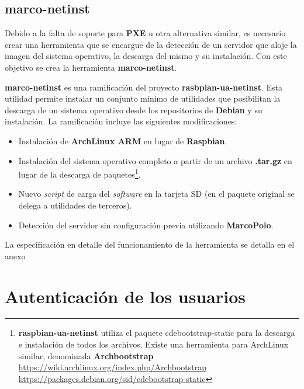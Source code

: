 \subsection{marco-netinst}

Debido a la falta de soporte para \textbf{PXE} u otra alternativa similar, es necesario crear una herramienta que se encargue de la detección de un servidor que aloje la imagen del sistema operativo, la descarga del mismo y su instalación. Con este objetivo se crea la herramienta \textbf{marco-netinst}.

\textbf{marco-netinst} es una ramificación del proyecto \textbf{rasbpian-ua-netinst}\cite{raspbian-ua-netinst}. Esta utilidad permite instalar un conjunto mínimo de utilidades que posibilitan la descarga de un sistema operativo desde los repositorios de \textbf{Debian} y su instalación. La ramificación incluye las siguientes modificaciones:

\begin{itemize}
	\item Instalación de \textbf{ArchLinux ARM} en lugar de \textbf{Raspbian}.
	\item Instalación del sistema operativo completo a partir de un archivo \textbf{.tar.gz} en lugar de la descarga de paquetes\footnote{\textbf{raspbian-ua-netinst} utiliza el paquete cdebootstrap-static para la descarga e instalación de todos los archivos. Existe una herramienta para ArchLinux similar, denominada \textbf{Archbootstrap}\\
	\href{https://wiki.archlinux.org/index.php/Archbootstrap}{https://wiki.archlinux.org/index.php/Archbootstrap}\\
	\href{https://packages.debian.org/sid/cdebootstrap-static}{https://packages.debian.org/sid/cdebootstrap-static}}.
	\item Nuevo \textit{script} de carga del \textit{software} en la tarjeta SD (en el paquete original se delega a utilidades de terceros).
	\item Detección del servidor sin configuración previa utilizando \textbf{MarcoPolo}.
\end{itemize}

La especificación en detalle del funcionamiento de la herramienta se detalla en el anexo%

\section{Autenticación de los usuarios}

